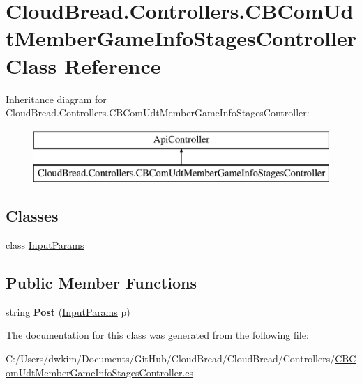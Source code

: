 \hypertarget{a00038}{}\section{Cloud\+Bread.\+Controllers.\+C\+B\+Com\+Udt\+Member\+Game\+Info\+Stages\+Controller Class Reference}
\label{a00038}
Inheritance diagram for Cloud\+Bread.\+Controllers.\+C\+B\+Com\+Udt\+Member\+Game\+Info\+Stages\+Controller\+:\begin{figure}[H]
\begin{center}
\leavevmode
\includegraphics[height=2.000000cm]{a00038}
\end{center}
\end{figure}
\subsection*{Classes}
\begin{DoxyCompactItemize}
\item 
class \hyperlink{a00106}{Input\+Params}
\end{DoxyCompactItemize}
\subsection*{Public Member Functions}
\begin{DoxyCompactItemize}
\item 
string {\bfseries Post} (\hyperlink{a00106}{Input\+Params} p)\hypertarget{a00038_a78f66a6ead0aed77f1acca7a43650789}{}\label{a00038_a78f66a6ead0aed77f1acca7a43650789}

\end{DoxyCompactItemize}


The documentation for this class was generated from the following file\+:\begin{DoxyCompactItemize}
\item 
C\+:/\+Users/dwkim/\+Documents/\+Git\+Hub/\+Cloud\+Bread/\+Cloud\+Bread/\+Controllers/\hyperlink{a00211}{C\+B\+Com\+Udt\+Member\+Game\+Info\+Stages\+Controller.\+cs}\end{DoxyCompactItemize}
